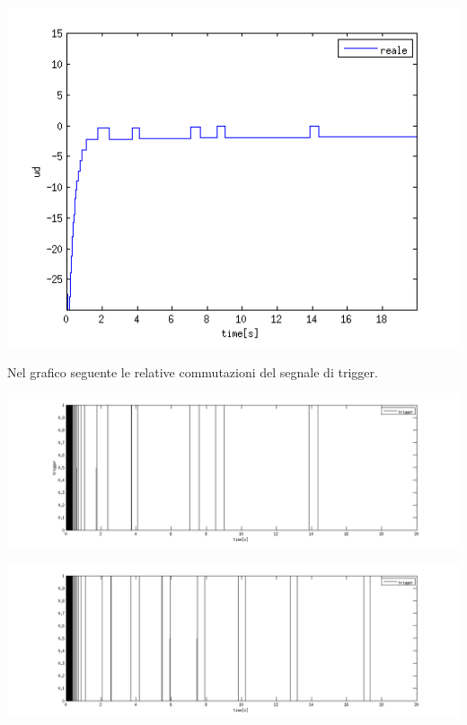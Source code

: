 \documentclass[a4paper,13pt]{article}
\begin{document}
\begin{center}
\includegraphics[scale=0.6]{graph/udiscsin.png}
\end{center}
	Nel grafico seguente le relative commutazioni del segnale di trigger.
\begin{center}
\includegraphics[scale=0.4]{graph/trigger2.png}
\end{center}
\begin{center}
\includegraphics[scale=0.4]{graph/trigger1.png}
\end{center}
\end{document}
